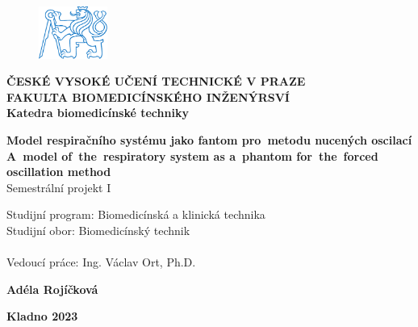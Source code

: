 \documentclass[a4paper,12pt]{article}   %
\numberwithin{equation}{section}        %
\newcommand{\autor}{Adéla Rojíčková}
\newcommand{\vedouci}{Ing. Václav Ort, Ph.D.}
\newcommand{\nazev}{Model respiračního systému jako fantom pro~metodu nucených oscilací}
\newcommand{\nazevENG}{A~model of~the~respiratory system as a~phantom for~the~forced oscillation method}
\newcommand{\typ}{Semestrální projekt I}
\newcommand{\rok}{2023}
\newcommand{\program}{Biomedicínská a klinická technika}
\newcommand{\obor}{Biomedicínský technik}       %
\begin{document}
    
	\pagestyle{empty}

	\begin{titlepage}
 		\begin{center}
 		\begin{figure}[!h]
			\centering
 			\includegraphics[width=0.2\textwidth]{symbol_cvut_konturova_verze}
 		\end{figure}
 		\textsf{\large{\textbf{ČESKÉ VYSOKÉ UČENÍ TECHNICKÉ V PRAZE}}}\\
         {\color{NavyBlue}\makebox[\linewidth]{\rule{\textwidth}{0.4mm}}}
 		\textsf{\normalsize{\textbf{FAKULTA BIOMEDICÍNSKÉHO INŽENÝRSVÍ}}}\\
		\textsf{\textbf{Katedra biomedicínské techniky}}\\	
		
		\vfill
 		
		\textsf{\Large{\textbf{\nazev}}}\\
	    \vspace{24pt}
		\textsf{\Large{\textbf{\nazevENG}}}\\
		\vspace{24pt}
		\textsf{\typ}\\ 
		\vfill
		\end{center}
		\textsf{Studijní program: \program} \\
		\textsf{Studijní obor: \obor} \\ %
		\\
		\textsf{Vedoucí práce: \vedouci}\\
				
		\begin{center}
		\textsf{\textbf{\autor}} \\ [0.5cm] 
		
		{\color{NavyBlue}\makebox[\linewidth]{\rule{\textwidth}{0.4mm}}} 
 		
		\textsf{\textbf{Kladno \rok}}
		\end{center}
			

		\clearpage


	\end{titlepage}
\end{document}
